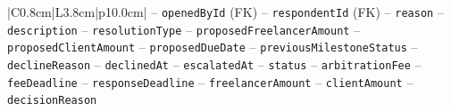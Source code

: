 \begin{center}
\begin{longtable}{|C{0.8cm}|L{3.8cm}|p{10.0cm}|}
\hspace*{1em}-- \texttt{opened\allowbreak By\allowbreak Id} (FK) \newline
\hspace*{1em}-- \texttt{respondent\allowbreak Id} (FK) \newline
\hspace*{1em}-- \texttt{reason} \newline
\hspace*{1em}-- \texttt{description} \newline
\hspace*{1em}-- \texttt{resolution\allowbreak Type} \newline
\hspace*{1em}-- \texttt{proposed\allowbreak Freelancer\allowbreak Amount} \newline
\hspace*{1em}-- \texttt{proposed\allowbreak Client\allowbreak Amount} \newline
\hspace*{1em}-- \texttt{proposed\allowbreak Due\allowbreak Date} \newline
\hspace*{1em}-- \texttt{previous\allowbreak Milestone\allowbreak Status} \newline
\hspace*{1em}-- \texttt{decline\allowbreak Reason} \newline
\hspace*{1em}-- \texttt{declined\allowbreak At} \newline
\hspace*{1em}-- \texttt{escalated\allowbreak At} \newline
\hspace*{1em}-- \texttt{status} \newline
\hspace*{1em}-- \texttt{arbitration\allowbreak Fee} \newline
\hspace*{1em}-- \texttt{fee\allowbreak Deadline} \newline
\hspace*{1em}-- \texttt{response\allowbreak Deadline} \newline
\hspace*{1em}-- \texttt{freelancer\allowbreak Amount} \newline
\hspace*{1em}-- \texttt{client\allowbreak Amount} \newline
\hspace*{1em}-- \texttt{decision\allowbreak Reason} \newline

\end{longtable}
\end{center}

